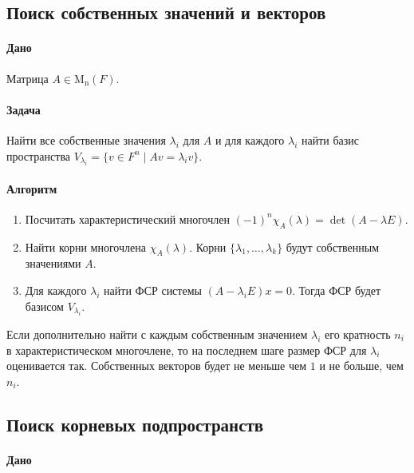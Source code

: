 \documentclass{article}
\newcommand{\Matrix}[2]{\operatorname{\mathrm{M}_{#2}}(#1)}
\begin{document}
\subsection{Поиск собственных значений и векторов}

\paragraph{Дано}

Матрица $A\in\Matrix{F}{n}$.

\paragraph{Задача}

Найти все собственные значения $\lambda_i$ для $A$ и для каждого $\lambda_i$ найти базис пространства $V_{\lambda_i} = \{v\in F^{n}\mid A v = \lambda_i v\}$.

\paragraph{Алгоритм}

\begin{enumerate}
\item Посчитать характеристический многочлен $(-1)^n\chi_A(\lambda) = \det(A-\lambda E)$.

\item Найти корни многочлена $\chi_A(\lambda)$.
Корни $\{\lambda_1,\ldots,\lambda_k\}$ будут собственным значениями $A$.

\item Для каждого $\lambda_i$ найти ФСР системы $(A-\lambda_i E)x = 0$.
Тогда ФСР будет базисом $V_{\lambda_i}$.
\end{enumerate}

Если дополнительно найти с каждым собственным значением $\lambda_i$ его кратность $n_i$ в характеристическом многочлене, то на последнем шаге размер ФСР для $\lambda_i$ оценивается так.
Собственных векторов будет не меньше чем $1$ и не больше, чем $n_i$.

\subsection{Поиск корневых подпространств}

\paragraph{Дано}
\end{document}
